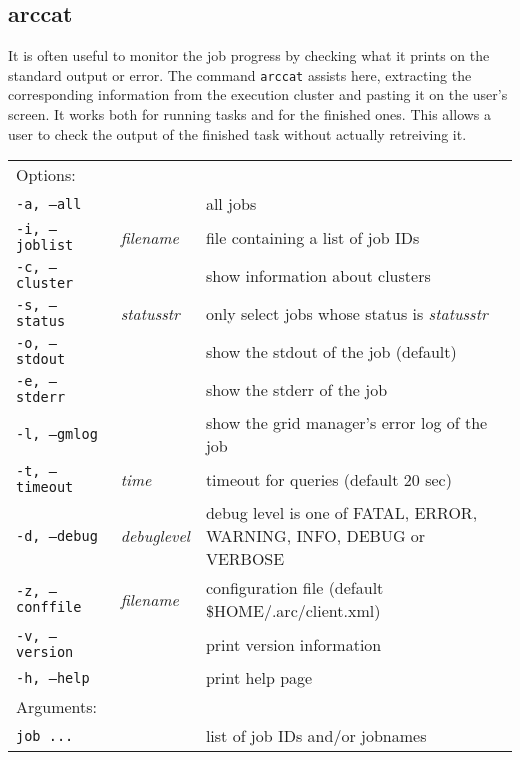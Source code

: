 \subsection{arccat}
\label{sec:arccat}

It is often useful to monitor the job progress by checking what it
prints on the standard output or error. The command \texttt{arccat}
 assists here, extracting the
corresponding information from the execution cluster and pasting it
on the user's screen. It works both for running tasks and for the
finished ones. This allows a user to check the output of the
finished task without actually retreiving it.

\hspace*{0.5cm}
\begin{shaded}
\end{shaded}
\begin{longtable}{llp{8cm}}
   Options:&&\\
   \texttt{-a, --all}& & all jobs\\
   \texttt{-i, --joblist}& \textit{filename} & file containing a list of job IDs\\
   \texttt{-c, --cluster}& & show information about clusters\\
   \texttt{-s, --status}& \textit{statusstr} &only select jobs whose status is \textit{statusstr}\\
   \texttt{-o, --stdout}& & show the stdout of the job (default)\\
   \texttt{-e, --stderr}& & show the stderr of the job\\
   \texttt{-l, --gmlog}& & show the grid manager's error log of the job\\
   \texttt{-t, --timeout}& \textit{time} & timeout for queries (default 20 sec)\\
   \texttt{-d, --debug}& \textit{debuglevel}&debug level is one of  FATAL, ERROR, WARNING, INFO, DEBUG or VERBOSE\\
   \texttt{-z, --conffile}&\textit{filename}& configuration file (default {\$}HOME/.arc/client.xml)\\
   \texttt{-v, --version}& & print version information\\
   \texttt{-h, --help}& & print help page\\
   Arguments:&&\\
   \texttt{job ...} && list of job IDs and/or jobnames\\
\end{longtable}

